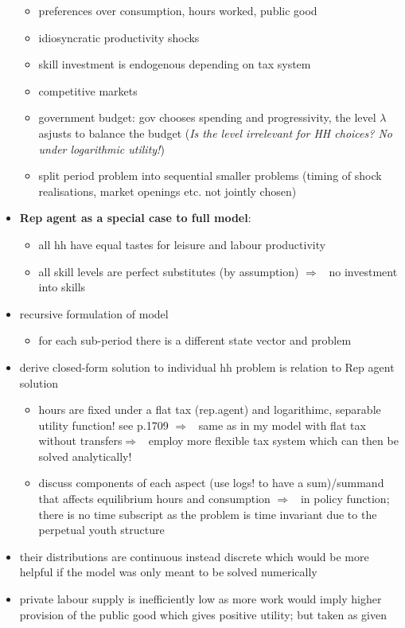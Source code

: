 \documentclass[12pt]{article}
\newcommand{\ar}{$\Rightarrow$ \ }
\begin{document}
\begin{itemize}
\begin{itemize}
	\item preferences over consumption, hours worked, public good
	\item idiosyncratic productivity shocks
	\item skill investment is endogenous depending on tax system 
	\item competitive markets
	\item government budget: gov chooses spending and progressivity, the level $\lambda$ asjusts to balance the budget (\textit{Is the level irrelevant for HH choices? No under logarithmic utility!})
	\item split period problem into sequential smaller problems (timing of shock realisations, market openings etc. not jointly chosen)
\end{itemize}
	\item \textbf{Rep agent as a special case to full model}:
	\begin{itemize}
	\item all hh have equal tastes for leisure and labour productivity
	\item all skill levels are perfect substitutes (by assumption) \ar no investment into skills
	\end{itemize}
\item recursive formulation of model
\begin{itemize}
\item for each sub-period there is a different state vector and problem
\end{itemize}
\item derive closed-form solution to individual hh problem is relation to Rep agent solution
\begin{itemize}
	\item hours are fixed under a flat tax (rep.agent) and logarithimc, separable utility function! see p.1709\textcolor{sonja}{ \ar same as in my model with flat tax without transfers\ar employ more flexible tax system which can then be solved analytically!}
	\item discuss components of each aspect (use logs! to have a sum)/summand that affects equilibrium hours and consumption \ar in policy function; there is no time subscript as the problem is time invariant due to  the perpetual youth structure
\end{itemize}
\item \textcolor{sonja}{their distributions are continuous instead discrete which would be more helpful if the model was only meant to be solved numerically}
\item private labour supply is inefficiently low as more work would imply higher provision of the public good which gives positive utility; but taken as given 

\end{itemize}
\end{document}
